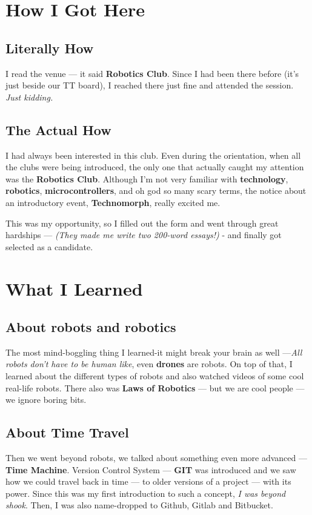 \documentclass[12pt]{article}
\begin{document}
\makecover

\setupmain

\section{How I Got Here}
\subsection{Literally How}

I read the venue — it said \textbf{Robotics Club}. Since I had been there before (it's just beside our TT board), I reached there just fine and attended the session.  
\textit{Just kidding.}

\subsection{The Actual How}

I had always been interested in this club. Even during the orientation, when all the clubs were being introduced, the only one that actually caught my attention was the \textbf{Robotics Club}.  
Although I’m not very familiar with \textbf{technology}, \textbf{robotics}, \textbf{microcontrollers}, and oh god so many scary terms, the notice about an introductory event, \textbf{Technomorph}, really excited me.

This was my opportunity, so I filled out the form and went through great hardships —  
\textit{(They made me write two 200-word essays!)} - and finally got selected as a candidate.


\section{What I Learned}
\subsection{About robots and robotics}
The most mind-boggling thing I learned-it might break your brain as well —\textit{All robots don't have to be human like}, even \textbf{drones} are robots.
On top of that, I learned about the different types of robots and also watched videos of some cool real-life robots.
There also was \textbf{Laws of Robotics} — but we are cool people — we ignore boring bits.

\subsection{About Time Travel}
Then we went beyond robots, we talked about something even more advanced — \textbf{Time Machine}. Version Control System — \textbf{GIT} was introduced and we saw how we could travel back in time — to older versions of a project — with its power. Since this was my first introduction to such a concept, \textit{I was beyond shook}. Then, I was also name-dropped to Github, Gitlab and Bitbucket.
\end{document}
